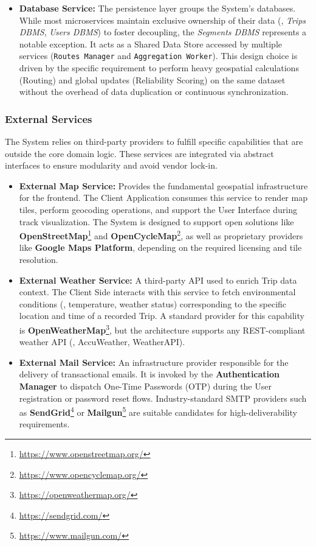 \begin{itemize}
    \item \textbf{Database Service:} The persistence layer groups the System's databases. While most microservices maintain exclusive ownership of their data (\eg, \emph{Trips DBMS}, \emph{Users DBMS}) to foster decoupling, the \emph{Segments DBMS} represents a notable exception. 
    It acts as a Shared Data Store accessed by multiple services (\texttt{Routes Manager} and \texttt{Aggregation Worker}). This design choice is driven by the specific requirement to perform heavy geospatial calculations (Routing) and global updates (Reliability Scoring) on the same dataset without the overhead of data duplication or continuous synchronization.
\end{itemize}

\subsubsection*{External Services}
The System relies on third-party providers to fulfill specific capabilities that are outside the core domain logic. These services are integrated via abstract interfaces to ensure modularity and avoid vendor lock-in.

\begin{itemize}
    \item \textbf{External Map Service:} Provides the fundamental geospatial infrastructure for the frontend. The Client Application consumes this service to render map tiles, perform geocoding operations, and support the User Interface during track visualization. The System is designed to support open solutions like \textbf{OpenStreetMap}\footnote{\url{https://www.openstreetmap.org/}} and \textbf{OpenCycleMap}\footnote{\url{https://www.opencyclemap.org/}}, as well as proprietary providers like \textbf{Google Maps Platform}, depending on the required licensing and tile resolution.

    \item \textbf{External Weather Service:} A third-party API used to enrich Trip data context. The Client Side interacts with this service to fetch environmental conditions (\eg, temperature, weather status) corresponding to the specific location and time of a recorded Trip. A standard provider for this capability is \textbf{OpenWeatherMap}\footnote{\url{https://openweathermap.org/}}, but the architecture supports any REST-compliant weather API (\eg, AccuWeather, WeatherAPI).

    \item \textbf{External Mail Service:} An infrastructure provider responsible for the delivery of transactional emails. It is invoked by the \textbf{Authentication Manager} to dispatch One-Time Passwords (OTP) during the User registration or password reset flows. Industry-standard SMTP providers such as \textbf{SendGrid}\footnote{\url{https://sendgrid.com/}} or \textbf{Mailgun}\footnote{\url{https://www.mailgun.com/}} are suitable candidates for high-deliverability requirements.
\end{itemize}

